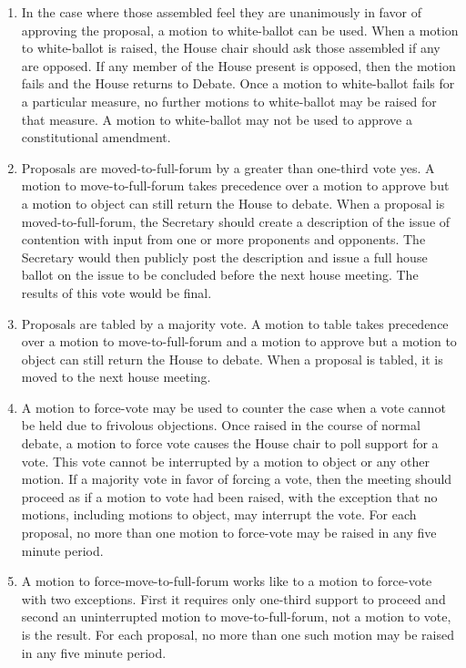 \documentclass[letterpaper]{article}
\begin{document}
\begin{enumerate}
\begin{enumerate}
\begin{enumerate}
\item In the case where those assembled feel they are unanimously in favor of approving the proposal, a motion to white-ballot can be used. When a motion to white-ballot is raised, the House chair should ask those assembled if any are opposed. If any member of the House present is opposed, then the motion fails and the House returns to Debate. Once a motion to white-ballot fails for a particular measure, no further motions to white-ballot may be raised for that measure. A motion to white-ballot may not be used to approve a constitutional amendment.

\item Proposals are moved-to-full-forum by a greater than one-third vote yes. A motion to move-to-full-forum takes precedence over a motion to approve but a motion to object can still return the House to debate. When a proposal is moved-to-full-forum, the Secretary should create a description of the issue of contention with input from one or more proponents and opponents. The Secretary would then publicly post the description and issue a full house ballot on the issue to be concluded before the next house meeting. The results of this vote would be final.

\item Proposals are tabled by a majority vote. A motion to table takes precedence over a motion to move-to-full-forum and a motion to approve but a motion to object can still return the House to debate. When a proposal is tabled, it is moved to the next house meeting.

\item A motion to force-vote may be used to counter the case when a vote cannot be held due to frivolous objections. Once raised in the course of normal debate, a motion to force vote causes the House chair to poll support for a vote. This vote cannot be interrupted by a motion to object or any other motion. If a majority vote in favor of forcing a vote, then the meeting should proceed as if a motion to vote had been raised, with the exception that no motions, including motions to object, may interrupt the vote. For each proposal, no more than one motion to force-vote may be raised in any five minute period.

\item A motion to force-move-to-full-forum works like to a motion to force-vote with two exceptions. First it requires only one-third support to proceed and second an uninterrupted motion to move-to-full-forum, not a motion to vote, is the result. For each proposal, no more than one such motion may be raised in any five minute period.


\end{enumerate}
\end{enumerate}
\end{enumerate}
\end{document}

